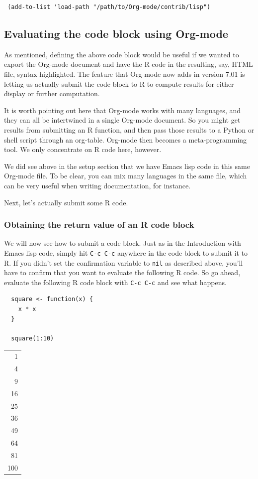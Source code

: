 \documentclass[11pt]{article}
\begin{document}
\begin{verbatim}
 (add-to-list 'load-path "/path/to/Org-mode/contrib/lisp")
\end{verbatim}
\subsection*{Evaluating the code block using Org-mode}
\label{sec-3-2}

As mentioned, defining the above code block would be useful if we wanted to export the Org-mode document and have the R code in the resulting, say, HTML file, syntax highlighted. The feature that Org-mode now adds in version 7.01 is letting us actually submit the code block to R to compute results for either display or further computation.

It is worth pointing out here that Org-mode works with many languages, and they can all be intertwined in a single Org-mode document. So you might get results from submitting an R function, and then pass those results to a Python or shell script through an org-table. Org-mode then becomes a meta-programming tool. We only concentrate on R code here, however.

We did see above in the setup section that we have Emacs lisp code in this same Org-mode file. To be clear, you can mix many languages in the same file, which can be very useful when writing documentation, for instance.

Next, let's actually submit some R code.

\subsubsection*{Obtaining the return value of an R code block}
\label{sec-3-2-1}

We will now see how to submit a code block. Just as in the Introduction with Emacs lisp code, simply hit \texttt{C-c C-c} anywhere in the code block to submit it to R. If you didn't set the confirmation variable to \texttt{nil} as described above, you'll have to confirm that you want to evaluate the following R code. So go ahead, evaluate the following R code block with \texttt{C-c C-c} and see what happens. 

\begin{verbatim}
  square <- function(x) {
    x * x
  }
  
  square(1:10)
\end{verbatim}

\begin{center}
\begin{tabular}{r}
1\\
4\\
9\\
16\\
25\\
36\\
49\\
64\\
81\\
100\\
\end{tabular}
\end{center}
\end{document}
